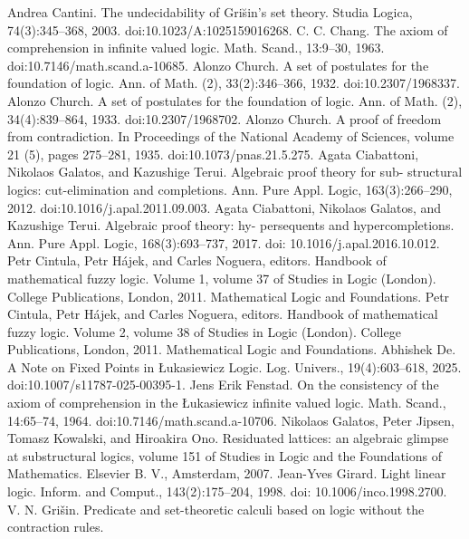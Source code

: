  Andrea Cantini. The undecidability of Gris̆in’s set theory. Studia Logica, 74(3):345–368, 2003.
doi:10.1023/A:1025159016268.
 C. C. Chang. The axiom of comprehension in infinite valued logic. Math. Scand., 13:9–30,
1963. doi:10.7146/math.scand.a-10685.
 Alonzo Church. A set of postulates for the foundation of logic. Ann. of Math. (2), 33(2):346–366,
1932. doi:10.2307/1968337.
 Alonzo Church. A set of postulates for the foundation of logic. Ann. of Math. (2), 34(4):839–864,
1933. doi:10.2307/1968702.
 Alonzo Church. A proof of freedom from contradiction. In Proceedings of the National Academy
of Sciences, volume 21 (5), pages 275–281, 1935. doi:10.1073/pnas.21.5.275.
 Agata Ciabattoni, Nikolaos Galatos, and Kazushige Terui. Algebraic proof theory for sub-
structural logics: cut-elimination and completions. Ann. Pure Appl. Logic, 163(3):266–290,
2012. doi:10.1016/j.apal.2011.09.003.
 Agata Ciabattoni, Nikolaos Galatos, and Kazushige Terui. Algebraic proof theory: hy-
persequents and hypercompletions. Ann. Pure Appl. Logic, 168(3):693–737, 2017. doi:
10.1016/j.apal.2016.10.012.
 Petr Cintula, Petr Hájek, and Carles Noguera, editors. Handbook of mathematical fuzzy
logic. Volume 1, volume 37 of Studies in Logic (London). College Publications, London, 2011.
Mathematical Logic and Foundations.
 Petr Cintula, Petr Hájek, and Carles Noguera, editors. Handbook of mathematical fuzzy
logic. Volume 2, volume 38 of Studies in Logic (London). College Publications, London, 2011.
Mathematical Logic and Foundations.
 Abhishek De. A Note on Fixed Points in Łukasiewicz Logic. Log. Univers., 19(4):603–618,
2025. doi:10.1007/s11787-025-00395-1.
 Jens Erik Fenstad. On the consistency of the axiom of comprehension in the Łukasiewicz
infinite valued logic. Math. Scand., 14:65–74, 1964. doi:10.7146/math.scand.a-10706.
 Nikolaos Galatos, Peter Jipsen, Tomasz Kowalski, and Hiroakira Ono. Residuated lattices: an
algebraic glimpse at substructural logics, volume 151 of Studies in Logic and the Foundations
of Mathematics. Elsevier B. V., Amsterdam, 2007.
 Jean-Yves Girard. Light linear logic. Inform. and Comput., 143(2):175–204, 1998. doi:
10.1006/inco.1998.2700.
 V. N. Grišin. Predicate and set-theoretic calculi based on logic without the contraction rules.
